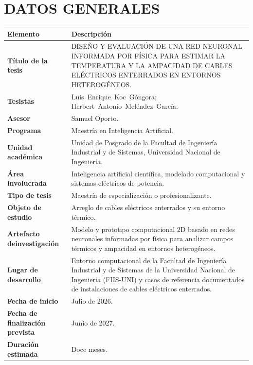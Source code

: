 \documentclass[11pt,a4paper,oneside]{report}
\renewcommand{\arraystretch}{1.18}
\newcommand{\tituloTesis}{DISEÑO Y EVALUACIÓN DE UNA RED NEURONAL INFORMADA POR FÍSICA PARA ESTIMAR LA TEMPERATURA Y LA AMPACIDAD DE CABLES ELÉCTRICOS ENTERRADOS EN ENTORNOS HETEROGÉNEOS}
\begin{document}
\chapter*{DATOS GENERALES}
\vspace{0.35cm}

\begingroup
\singlespacing
\setlength{\parskip}{0pt}
\setlength{\parindent}{0pt}
\setlength{\tabcolsep}{10pt}
\renewcommand{\arraystretch}{1.28}
\noindent
\begin{tabularx}{\textwidth}{
  >{\bfseries\RaggedRight\setlength{\parindent}{0pt}\arraybackslash}p{4.15cm}
  J
}
\toprule
{}
\textbf{Elemento} & \textbf{Descripción} \\
\midrule
Título de la tesis & \tituloTesis. \\
\addlinespace[5pt]
Tesistas & \mbox{Luis Enrique Koc Góngora};\newline
           \mbox{Herbert Antonio Meléndez García}. \\
\addlinespace[5pt]
Asesor & Samuel Oporto. \\
\addlinespace[5pt]
Programa & Maestría en Inteligencia Artificial. \\
\addlinespace[5pt]
Unidad académica & Unidad de Posgrado de la Facultad de Ingeniería Industrial y de Sistemas, Universidad Nacional de Ingeniería. \\
\addlinespace[5pt]
Área involucrada & Inteligencia artificial científica, modelado computacional y sistemas eléctricos de potencia. \\
\addlinespace[5pt]
Tipo de tesis & Maestría de especialización o profesionalizante. \\
\addlinespace[5pt]
Objeto de estudio & Arreglo de cables eléctricos enterrados y su entorno térmico. \\
\addlinespace[5pt]
Artefacto de\newline investigación & Modelo y prototipo computacional 2D basado en redes neuronales informadas por física para analizar campos térmicos y ampacidad en entornos heterogéneos. \\
\addlinespace[5pt]
Lugar de desarrollo & Entorno computacional de la Facultad de Ingeniería Industrial y de Sistemas de la Universidad Nacional de Ingeniería (FIIS-UNI) y casos de referencia documentados de instalaciones de cables eléctricos enterrados. \\
\addlinespace[5pt]
Fecha de inicio & Julio de 2026. \\
\addlinespace[5pt]
Fecha de finalización prevista & Junio de 2027. \\
\addlinespace[5pt]
Duración estimada & Doce meses. \\
\bottomrule
\end{tabularx}
\endgroup
\end{document}
